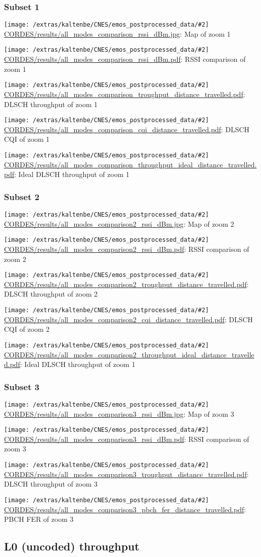 \documentclass[a4paper,10pt]{article}
\newcommand{\printfile}[2][]{
 \begin{minipage}{8cm}
  \centering
  \texttt{[image: /extras/kaltenbe/CNES/emos\_postprocessed\_data/\#2]}
  \url{#2}: #1

 \end{minipage}
}
\begin{document}

\subsubsection*{Subset 1}

\printfile[Map of zoom 1]{CORDES/results/all_modes_comparison_rssi_dBm.jpg}
\printfile[RSSI comparison of zoom 1]{CORDES/results/all_modes_comparison_rssi_dBm.pdf}

\printfile[DLSCH throughput of zoom 1]{CORDES/results/all_modes_comparison_troughput_distance_travelled.pdf}
\printfile[DLSCH CQI of zoom 1]{CORDES/results/all_modes_comparison_cqi_distance_travelled.pdf}

\printfile[Ideal DLSCH throughput of zoom 1]{CORDES/results/all_modes_comparison_throughput_ideal_distance_travelled.pdf}

\subsubsection*{Subset 2}

\printfile[Map of zoom 2]{CORDES/results/all_modes_comparison2_rssi_dBm.jpg}
\printfile[RSSI comparison of zoom 2]{CORDES/results/all_modes_comparison2_rssi_dBm.pdf}

\printfile[DLSCH throughput of zoom 2]{CORDES/results/all_modes_comparison2_troughput_distance_travelled.pdf}
\printfile[DLSCH CQI of zoom 2]{CORDES/results/all_modes_comparison2_cqi_distance_travelled.pdf}

\printfile[Ideal DLSCH throughput of zoom 1]{CORDES/results/all_modes_comparison2_throughput_ideal_distance_travelled.pdf}

\subsubsection*{Subset 3}

\printfile[Map of zoom 3]{CORDES/results/all_modes_comparison3_rssi_dBm.jpg}
\printfile[RSSI comparison of zoom 3]{CORDES/results/all_modes_comparison3_rssi_dBm.pdf}

\printfile[DLSCH throughput of zoom 3]{CORDES/results/all_modes_comparison3_troughput_distance_travelled.pdf}
\printfile[PBCH FER of zoom 3]{CORDES/results/all_modes_comparison3_pbch_fer_distance_travelled.pdf}


\subsection{L0 (uncoded) throughput}
\end{document}
